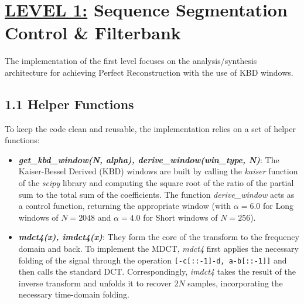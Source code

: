 \documentclass[11pt,twocolumn]{article}
\newcommand{\fn}[1]{\textit{#1}}
\newcommand{\level}[2]{\section*{\underline{LEVEL #1:} #2}}
\newcommand{\sub}[1]{\subsection*{#1}}
\begin{document}
\thispagestyle{fancy}

\level{1}{Sequence Segmentation Control \& Filterbank}

The implementation of the first level focuses on the analysis/synthesis architecture for achieving Perfect Reconstruction with the use of KBD windows.

\sub{1.1 Helper Functions}
To keep the code clean and reusable, the implementation relies on a set of helper functions:
\begin{itemize}
  \item \textbf{\fn{get\_kbd\_window(N, alpha), derive\_window(win\_type, N)}}: The Kaiser-Bessel Derived (KBD) windows are built by calling the \fn{kaiser} function of the \fn{scipy} library and computing the square root of the ratio of the partial sum to the total sum of the coefficients. The function \fn{derive\_window} acts as a control function, returning the appropriate window (with $\alpha=6.0$ for Long windows of $N=2048$ and $\alpha=4.0$ for Short windows of $N=256$).
  \item \textbf{\fn{mdct4(x), imdct4(x)}}: They form the core of the transform to the frequency domain and back. To implement the MDCT, \fn{mdct4} first applies the necessary folding of the signal through the operation \texttt{[-c[::-1]-d, a-b[::-1]]} and then calls the standard DCT. Correspondingly, \fn{imdct4} takes the result of the inverse transform and unfolds it to recover $2N$ samples, incorporating the necessary time-domain folding.
\end{itemize}
\end{document}
